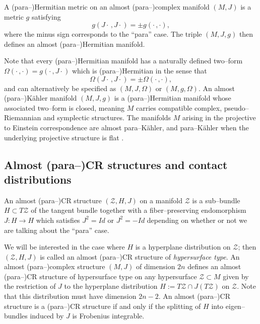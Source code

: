 \begin{defi}
A (para--)Hermitian metric on an almost (para--)complex manifold $(M,J)$ is a metric $g$ satisfying
\[
g(J\cdot\,,J\cdot) = \pm g(\cdot\,,\cdot),
\]
where the minus sign corresponds to the ``para'' case. The triple $(M,J,g)$ then defines an almost (para--)Hermitian manifold.
\end{defi}

Note that every (para--)Hermitian manifold has a naturally defined two--form $\Omega(\cdot\,,\cdot)=g(\cdot\,,J\cdot)$ which is (para--)Hermitian in the sense that
\[
\Omega(J\cdot\,,J\cdot) = \pm \Omega(\cdot\,,\cdot),
\]
and can alternatively be specified as $(M,J,\Omega)$ or $(M,g,\Omega)$. An almost (para--)K\"ahler manifold $(M,J,g)$ is a (para--)Hermitian manifold whose associated two--form is closed, meaning $M$ carries compatible complex, pseudo--Riemannian and symplectic structures. The manifolds $M$ arising in the projective to Einstein correspondence are almost para--K\"ahler, and para--K\"ahler when the underlying projective structure is flat \cite{DM}.

\subsection{Almost (para--)CR structures and contact distributions}


\begin{defi}
An almost (para--)CR structure $(\mathcal{Z},H ,J)$ on a manifold $\mathcal{Z}$ is a sub--bundle $H \subset T\mathcal{Z}$ of the tangent bundle together with a fiber--preserving endomorphism $J:H \rightarrow H $ which satisfies $J^2=Id$ or $J^2=-Id$ depending on whether or not we are talking about the ``para'' case.
\end{defi}

We will be interested in the case where $ H $ is a hyperplane distribution on $\mathcal{Z}$; then $(\mathcal{Z}, H ,J)$ is called an almost (para--)CR structure of \textit{hypersurface type}. An almost (para--)complex structure $(M,J)$ of dimension $2n$ defines an almost (para--)CR structure of hypersurface type on any hypersurface $\mathcal{Z}\subset M$ given by the restriction of $J$ to the hyperplane distribution $ H :=T\mathcal{Z}\cap J(T\mathcal{Z})$ on $\mathcal{Z}$. Note that this distribution must have dimension $2n-2$. An almost (para--)CR structure is a (para--)CR structure if and only if the splitting of $ H $ into eigen--bundles induced by $J$ is Frobenius integrable.

